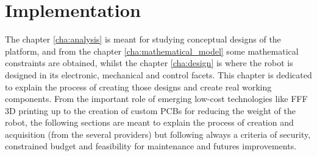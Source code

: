 \chapter{Implementation} %
\label{cha:implementation}
The chapter \ref{cha:analysis} is meant for studying conceptual designs of the platform, and from the chapter \ref{cha:mathematical_model} some mathematical constraints are obtained, whilst the chapter \ref{cha:design} is where the robot is designed in its electronic, mechanical and control facets.
This chapter is dedicated to explain the process of creating those designs and create real working components.
From the important role of emerging low-cost technologies like FFF 3D printing up to the creation of custom PCBs for reducing the weight of the robot, the following sections are meant to explain the process of creation and acquisition (from the several providers) but following always a criteria of security, constrained budget and feasibility for maintenance and futures improvements.








